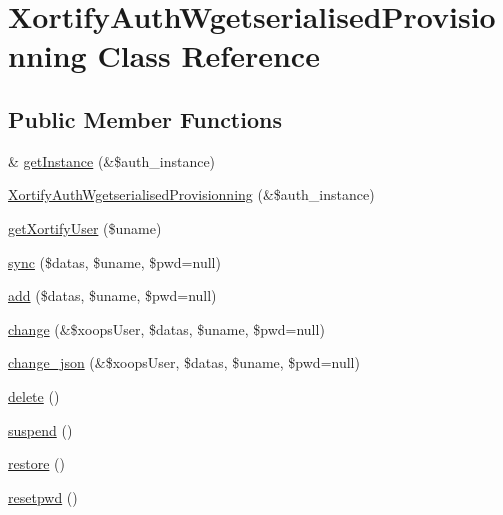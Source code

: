 \hypertarget{class_xortify_auth_wgetserialised_provisionning}{\section{Xortify\-Auth\-Wgetserialised\-Provisionning Class Reference}
\label{class_xortify_auth_wgetserialised_provisionning}
}
\subsection*{Public Member Functions}
\begin{DoxyCompactItemize}
\item 
\& \hyperlink{class_xortify_auth_wgetserialised_provisionning_a2c8eaa915c70d75289ac8a03686194f9}{get\-Instance} (\&\$auth\-\_\-instance)
\item 
\hyperlink{class_xortify_auth_wgetserialised_provisionning_aec6821499309e62b1196f632361b8849}{Xortify\-Auth\-Wgetserialised\-Provisionning} (\&\$auth\-\_\-instance)
\item 
\hyperlink{class_xortify_auth_wgetserialised_provisionning_a041d726ac26672547ed1504e8e0117aa}{get\-Xortify\-User} (\$uname)
\item 
\hyperlink{class_xortify_auth_wgetserialised_provisionning_a35dc08b0f2138eb818ff95345b73bcff}{sync} (\$datas, \$uname, \$pwd=null)
\item 
\hyperlink{class_xortify_auth_wgetserialised_provisionning_adfc9fcef01e7bd7b2f47e8e79d51fc63}{add} (\$datas, \$uname, \$pwd=null)
\item 
\hyperlink{class_xortify_auth_wgetserialised_provisionning_ae1f0971b9712c794620cf309164e43af}{change} (\&\$xoops\-User, \$datas, \$uname, \$pwd=null)
\item 
\hyperlink{class_xortify_auth_wgetserialised_provisionning_a94f4e0408f26e65abca347ec883f4ec9}{change\-\_\-json} (\&\$xoops\-User, \$datas, \$uname, \$pwd=null)
\item 
\hyperlink{class_xortify_auth_wgetserialised_provisionning_a13bdffdd926f26b825ea57066334ff01}{delete} ()
\item 
\hyperlink{class_xortify_auth_wgetserialised_provisionning_ad73006a505121228f3b075c2409787d2}{suspend} ()
\item 
\hyperlink{class_xortify_auth_wgetserialised_provisionning_aa1371f22826cf8cde4454c9b467203d0}{restore} ()
\item 
\hyperlink{class_xortify_auth_wgetserialised_provisionning_a06d70fbd3a2db390b6f2530c0076628e}{resetpwd} ()
\end{DoxyCompactItemize}
